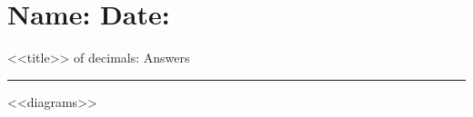 \documentclass[leqno, 12pt]{article}
\def \HeadingAnswers {\section*{\Large Name: \underline{\hspace{8cm}} \hfill Date: \underline{\hspace{3cm}}} \vspace{-3mm}
{<<title>> of decimals: Answers} \vspace{1pt}\hrule}
\begin{document}
\HeadingAnswers
\vspace{-5mm}
\begin{multicols}{3}
<<diagrams>>
\end{multicols}
\end{document}
